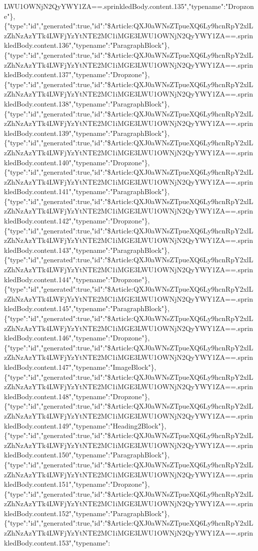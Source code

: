 LWU1OWNjN2QyYWY1ZA==.sprinkledBody.content.135","typename":"Dropzone"\},\{"type":"id","generated":true,"id":"\$Article:QXJ0aWNsZTpueXQ6Ly9hcnRpY2xlLzZhNzAzYTk4LWFjYzYtNTE2MC1iMGE3LWU1OWNjN2QyYWY1ZA==.sprinkledBody.content.136","typename":"ParagraphBlock"\},\{"type":"id","generated":true,"id":"\$Article:QXJ0aWNsZTpueXQ6Ly9hcnRpY2xlLzZhNzAzYTk4LWFjYzYtNTE2MC1iMGE3LWU1OWNjN2QyYWY1ZA==.sprinkledBody.content.137","typename":"Dropzone"\},\{"type":"id","generated":true,"id":"\$Article:QXJ0aWNsZTpueXQ6Ly9hcnRpY2xlLzZhNzAzYTk4LWFjYzYtNTE2MC1iMGE3LWU1OWNjN2QyYWY1ZA==.sprinkledBody.content.138","typename":"ParagraphBlock"\},\{"type":"id","generated":true,"id":"\$Article:QXJ0aWNsZTpueXQ6Ly9hcnRpY2xlLzZhNzAzYTk4LWFjYzYtNTE2MC1iMGE3LWU1OWNjN2QyYWY1ZA==.sprinkledBody.content.139","typename":"ParagraphBlock"\},\{"type":"id","generated":true,"id":"\$Article:QXJ0aWNsZTpueXQ6Ly9hcnRpY2xlLzZhNzAzYTk4LWFjYzYtNTE2MC1iMGE3LWU1OWNjN2QyYWY1ZA==.sprinkledBody.content.140","typename":"Dropzone"\},\{"type":"id","generated":true,"id":"\$Article:QXJ0aWNsZTpueXQ6Ly9hcnRpY2xlLzZhNzAzYTk4LWFjYzYtNTE2MC1iMGE3LWU1OWNjN2QyYWY1ZA==.sprinkledBody.content.141","typename":"ParagraphBlock"\},\{"type":"id","generated":true,"id":"\$Article:QXJ0aWNsZTpueXQ6Ly9hcnRpY2xlLzZhNzAzYTk4LWFjYzYtNTE2MC1iMGE3LWU1OWNjN2QyYWY1ZA==.sprinkledBody.content.142","typename":"Dropzone"\},\{"type":"id","generated":true,"id":"\$Article:QXJ0aWNsZTpueXQ6Ly9hcnRpY2xlLzZhNzAzYTk4LWFjYzYtNTE2MC1iMGE3LWU1OWNjN2QyYWY1ZA==.sprinkledBody.content.143","typename":"ParagraphBlock"\},\{"type":"id","generated":true,"id":"\$Article:QXJ0aWNsZTpueXQ6Ly9hcnRpY2xlLzZhNzAzYTk4LWFjYzYtNTE2MC1iMGE3LWU1OWNjN2QyYWY1ZA==.sprinkledBody.content.144","typename":"Dropzone"\},\{"type":"id","generated":true,"id":"\$Article:QXJ0aWNsZTpueXQ6Ly9hcnRpY2xlLzZhNzAzYTk4LWFjYzYtNTE2MC1iMGE3LWU1OWNjN2QyYWY1ZA==.sprinkledBody.content.145","typename":"ParagraphBlock"\},\{"type":"id","generated":true,"id":"\$Article:QXJ0aWNsZTpueXQ6Ly9hcnRpY2xlLzZhNzAzYTk4LWFjYzYtNTE2MC1iMGE3LWU1OWNjN2QyYWY1ZA==.sprinkledBody.content.146","typename":"Dropzone"\},\{"type":"id","generated":true,"id":"\$Article:QXJ0aWNsZTpueXQ6Ly9hcnRpY2xlLzZhNzAzYTk4LWFjYzYtNTE2MC1iMGE3LWU1OWNjN2QyYWY1ZA==.sprinkledBody.content.147","typename":"ImageBlock"\},\{"type":"id","generated":true,"id":"\$Article:QXJ0aWNsZTpueXQ6Ly9hcnRpY2xlLzZhNzAzYTk4LWFjYzYtNTE2MC1iMGE3LWU1OWNjN2QyYWY1ZA==.sprinkledBody.content.148","typename":"Dropzone"\},\{"type":"id","generated":true,"id":"\$Article:QXJ0aWNsZTpueXQ6Ly9hcnRpY2xlLzZhNzAzYTk4LWFjYzYtNTE2MC1iMGE3LWU1OWNjN2QyYWY1ZA==.sprinkledBody.content.149","typename":"Heading2Block"\},\{"type":"id","generated":true,"id":"\$Article:QXJ0aWNsZTpueXQ6Ly9hcnRpY2xlLzZhNzAzYTk4LWFjYzYtNTE2MC1iMGE3LWU1OWNjN2QyYWY1ZA==.sprinkledBody.content.150","typename":"ParagraphBlock"\},\{"type":"id","generated":true,"id":"\$Article:QXJ0aWNsZTpueXQ6Ly9hcnRpY2xlLzZhNzAzYTk4LWFjYzYtNTE2MC1iMGE3LWU1OWNjN2QyYWY1ZA==.sprinkledBody.content.151","typename":"Dropzone"\},\{"type":"id","generated":true,"id":"\$Article:QXJ0aWNsZTpueXQ6Ly9hcnRpY2xlLzZhNzAzYTk4LWFjYzYtNTE2MC1iMGE3LWU1OWNjN2QyYWY1ZA==.sprinkledBody.content.152","typename":"ParagraphBlock"\},\{"type":"id","generated":true,"id":"\$Article:QXJ0aWNsZTpueXQ6Ly9hcnRpY2xlLzZhNzAzYTk4LWFjYzYtNTE2MC1iMGE3LWU1OWNjN2QyYWY1ZA==.sprinkledBody.content.153","typename":